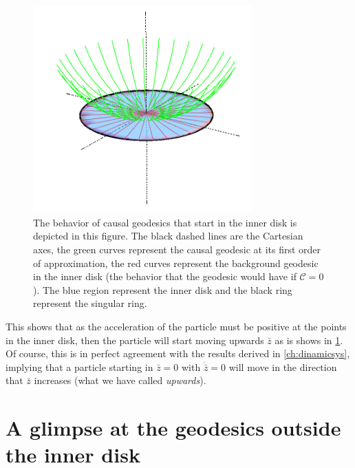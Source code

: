 \begin{figure}[hpt!]
\begin{center}
 \centerline{\includegraphics[width=0.75\textwidth]{img/Chapter5/Esc.png}}
 \end{center}
 \caption{The behavior of causal geodesics that start in the inner disk is depicted in this figure. The black dashed lines are the Cartesian axes, the green curves represent the causal geodesic at its first order of approximation, the red curves represent the background geodesic in the inner disk (the behavior that the geodesic would have if $\mathcal{C}=0$). The blue region represent the inner disk and the black ring represent the singular ring.}
 \label{fig:escape}
\end{figure} 

This shows that as the acceleration of the particle must be positive at the points in the inner disk, then the particle will start moving upwards $\bar{z}$ as is shows in \cref{fig:escape}. Of course, this is in perfect agreement with the results derived in \cref{ch:dinamicsys}, implying that a particle starting in $\bar{z}=0$ with $\dot{\bar{z}}=0$ will move in the direction that $\bar{z}$ increases (what we have called \textit{upwards}).

\section{A glimpse at the geodesics outside the inner disk}

